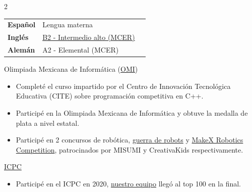 \documentclass[10pt,a4paper,ragged2e,withhyper]{altacv}
\begin{document}
\begin{paracol}{2}
  \\

  \begin{tabular}{l | ll}
    \textbf{Español} & Lengua materna\\
    \textbf{Inglés} & \href{https://drive.google.com/file/d/1gBM0AOUTz7h87_4FS4IsUOT8kphNWD5m/view?usp=sharing}{\color{ColorLinks}B2 - Intermedio alto (MCER)\color{black}}\\
    \textbf{Alemán} & A2 - Elemental (MCER)
  \end{tabular}

  {Olimpiada Mexicana de Informática
  ({\href{https://www.olimpiadadeinformatica.org.mx/OMI/OMI/InfoGeneral/Que_es_la_OMI.aspx}{\color{ColorLinks}OMI\color{black}}})}
  {}{}
  \begin{itemize}
    \item Completé el curso impartido por el Centro de Innovación Tecnológica
    Educativa (CITE) sobre programación competitiva en C++.
    \item Participé en la Olimpiada Mexicana de Informática y obtuve la medalla
    de plata a nivel estatal.
  \end{itemize}
  \divider
  \begin{itemize}
    \item Participé en 2 concursos de robótica,
    {\href{https://drive.google.com/file/d/1xETjexZx_X1Bg46y_-m8kKneEbaz48dQ/view?usp=sharing}{\color{ColorLinks}
    guerra de robots\color{black}}} y
    {\href{https://drive.google.com/file/d/1QcXzJbDVQ1dSvtQrdd_j387KvKlfXH8J/view?usp=sharing}{\color{ColorLinks}
    MakeX Robotics Competition\color{black}}}, patrocinados por MISUMI y
    CreativaKids respectivamente.
  \end{itemize}
  \divider
  {{\href{https://es.wikipedia.org/wiki/Competición_Internacional_Universitaria_de_Programación}{\color{ColorLinks}ICPC\color{black}}}}
  {}{}
  \begin{itemize}
    \item Participé en el ICPC en 2020,
    {\href{https://drive.google.com/file/d/1OwYn_YItOoTw_DI-Dajlrwc_oC57Rv6G/view?usp=sharing}{\color{ColorLinks}
    nuestro equipo\color{black}}} llegó al top 100 en la final.
  \end{itemize}

  \newpage
\end{paracol}
\end{document}
